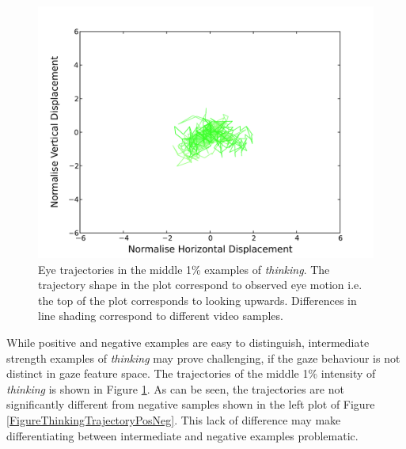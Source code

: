 \begin{figure}[tb]
\centering
\includegraphics[width = 0.49 \columnwidth]{nvcclass/traj50.pdf}
\caption[Eye trajectories in the middle 1\% examples of \textit{thinking}.]{Eye trajectories in the middle 1\% examples of \textit{thinking}. The trajectory shape in the plot correspond to observed eye motion i.e. the top of the plot corresponds to looking upwards. Differences in line shading correspond to different video samples.}
\label{FigureThinkingTrajectoryIntermediate}
\end{figure}

While positive and negative examples are easy to distinguish, intermediate strength examples of \textit{thinking} may prove challenging, if the gaze behaviour is not distinct in gaze feature space. The trajectories of the middle 1\% intensity of \textit{thinking} is shown in Figure \ref{FigureThinkingTrajectoryIntermediate}. As can be seen, the trajectories are not significantly different from negative samples shown in the left plot of Figure \ref{FigureThinkingTrajectoryPosNeg}. This lack of difference may make differentiating between intermediate and negative examples problematic. %

